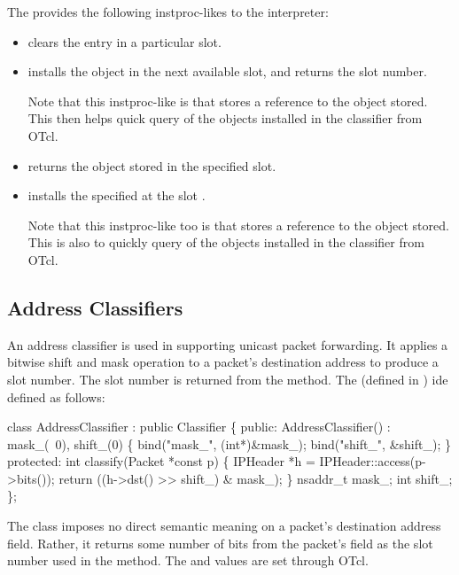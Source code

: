 {The 
provides the following instproc-likes to the interpreter:
\begin{itemize}\itemsep0pt
\item {} clears the entry in a particular slot.
\item {} installs the object
        in the next available slot, and returns the slot number.

        Note that this instproc-like is 
        that stores a reference to the object stored.
        This then helps quick query of the objects
        installed in the classifier from OTcl.
\item {} returns the object stored in the specified slot.
\item {} installs the specified
         at the slot .

        Note that this instproc-like too is 
        that stores a reference to the object stored.
        This is also to quickly query of the objects
        installed in the classifier from OTcl.
\end{itemize}

\subsection{Address Classifiers}
\label{sec:node:addr-classifier}

An address classifier is used in supporting unicast packet forwarding.
It applies a bitwise shift and mask operation to a packet's destination
address to produce a slot number.
The slot number is returned from the  method.
The 
(defined in ) ide defined as follows:
\begin{program}
        class AddressClassifier : public Classifier \{
        public:
                AddressClassifier() : mask_(~0), shift_(0) \{
                        bind("mask_", (int*)&mask_);
                        bind("shift_", &shift_);
                \}
        protected:
                int classify(Packet *const p) \{
                        IPHeader *h = IPHeader::access(p->bits());
                        return ((h->dst() >> shift_) & mask_);
                \}
                nsaddr_t mask_;
                int shift_;
        \};
\end{program}
The class imposes no direct semantic meaning
on a packet's destination address field.
Rather, it returns some number of bits from the packet's
 field as the slot number used
in the  method.
The  and  values are set through OTcl.

}
